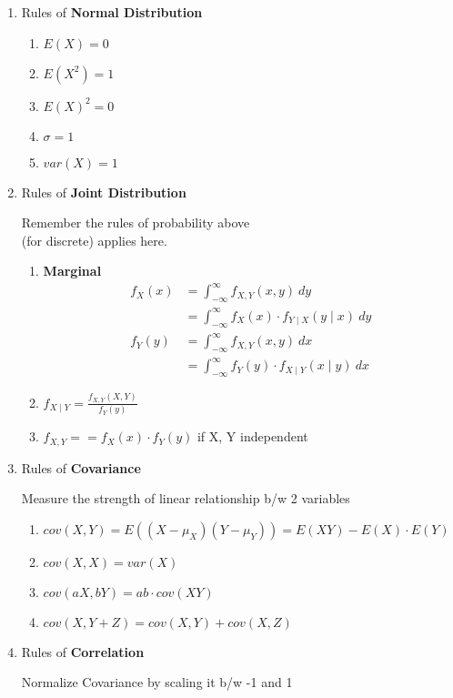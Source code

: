 \documentclass{article}
\begin{document}
\begin{small}
\begin{multicols}{2}
\begin{enumerate}
\item Rules of \textbf{Normal Distribution}
  \begin{enumerate}
  \item $E(X) = 0$
  \item $E(X^2) = 1$
  \item $E(X)^2 = 0$
  \item $\sigma = 1$
  \item $var(X) = 1$
  \end{enumerate}
\item Rules of \textbf{Joint Distribution}

Remember the rules of probability above\\(for discrete) applies here. 

  \begin{enumerate}
  \item\textbf{Marginal}
  \begin{align*}
  f_X(x) & = \int_{-\infty}^{\infty} f_{X,Y}(x, y) \ dy \\
         & = \int_{-\infty}^{\infty} f_X(x) \cdot f_{Y \mid X}(y \mid x) \ dy \\
  f_Y(y) & = \int_{-\infty}^{\infty} f_{X,Y}(x, y) \ dx \\
         & = \int_{-\infty}^{\infty} f_Y(y) \cdot f_{X \mid Y}(x \mid y) \ dx
  \end{align*}
  \item $f_{X \mid Y} = \frac{f_{X, Y}(X, Y)}{f_Y(y)}$
  \item $f_{X, Y} == f_X(x) \cdot f_Y(y)$ if X, Y independent
  \end{enumerate}

\item Rules of \textbf{Covariance}

Measure the strength of linear relationship b/w 2 variables

  \begin{enumerate}
  \item $cov(X, Y) = E((X - \mu_X)(Y - \mu_Y)) = E(XY) - E(X) \cdot E(Y)$
  \item $cov(X, X) = var(X)$
  \item $cov(aX, bY) = ab \cdot cov(XY)$
  \item $cov(X, Y+Z) = cov(X, Y) + cov(X, Z)$
  \end{enumerate}

\item Rules of \textbf{Correlation}

Normalize Covariance by scaling it b/w -1 and 1


\end{enumerate}
\end{multicols}
\end{small}
\end{document}
